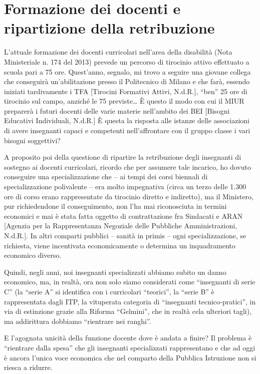 \section*{Formazione dei docenti e ripartizione della retribuzione}

L'attuale formazione dei docenti curricolari nell'area della disabilità (Nota Ministeriale n. 174 del 2013) prevede un percorso di tirocinio attivo effettuato a scuola pari a 75 ore. Quest'anno, segnalo, mi trovo a seguire una giovane collega che conseguirà un'abilitazione presso il Politecnico di Milano e che farà, essendo iniziati tardivamente i TFA [Tirocini Formativi Attivi, N.d.R.], “ben” 25 ore di tirocinio sul campo, anziché le 75 previste… È questo il modo con cui il MIUR preparerà i futuri docenti delle varie materie nell'ambito dei BEI [Bisogni Educativi Individuali, N.d.R.] È questa la risposta alle istanze delle associazioni di avere insegnanti capaci e competenti nell'affrontare con il gruppo classe i vari bisogni soggettivi?

A proposito poi della questione di ripartire la retribuzione degli insegnanti di sostegno ai docenti curricolari, ricordo che per assumere tale incarico, ho dovuto conseguire una specializzazione che – ai tempi dei corsi biennali di specializzazione polivalente – era molto impegnativa (circa un terzo delle 1.300 ore di corso erano rappresentate da tirocinio diretto e indiretto), ma il Ministero, pur richiedendone il conseguimento, non l'ha mai riconosciuta in termini economici e mai è stata fatta oggetto di contrattazione fra Sindacati e ARAN [Agenzia per la Rappresentanza Negoziale delle Pubbliche Amministrazioni, N.d.R.]. In altri comparti pubblici – sanità in primis – ogni specializzazione, se richiesta, viene incentivata economicamente o determina un inquadramento economico diverso.

Quindi, negli anni, noi insegnanti specializzati abbiamo subito un danno economico, ma, in realtà, ora non solo siamo considerati come “insegnanti di serie C” (la “serie A” si identifica con i curricolari “teorici”, la “serie B” è rappresentata dagli ITP, la vituperata categoria di “insegnanti tecnico-pratici”, in via di estinzione grazie alla Riforma “Gelmini”, che in realtà cela ulteriori tagli), ma addirittura dobbiamo “rientrare nei ranghi”.

E l'agognata unicità della funzione docente dove è andata a finire? Il problema è “rientrare dalla spesa” che gli insegnanti specializzati rappresentano e che ad oggi è ancora l'unica voce economica che nel comparto della Pubblica Istruzione non si riesca a ridurre.

